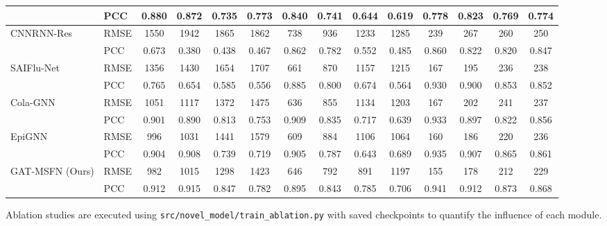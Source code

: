 \begin{table*}[ht]
{\begin{tabular}{llcccccccccccc}
         & PCC  & 0.880 & 0.872 & 0.735 & 0.773 & 0.840 & 0.741 & 0.644 & 0.619 & 0.778 & 0.823 & 0.769 & 0.774 \\
        \midrule
        \multirow{2}{*}{CNNRNN-Res} 
         & RMSE & 1550 & 1942 & 1865 & 1862 & 738 & 936 & 1233 & 1285 & 239 & 267 & 260 & 250 \\
         & PCC  & 0.673 & 0.380 & 0.438 & 0.467 & 0.862 & 0.782 & 0.552 & 0.485 & 0.860 & 0.822 & 0.820 & 0.847 \\
        \midrule
        \multirow{2}{*}{SAIFlu-Net} 
         & RMSE & 1356 & 1430 & 1654 & 1707 & 661 & 870 & 1157 & 1215 & 167 & 195 & 236 & 238 \\
         & PCC  & 0.765 & 0.654 & 0.585 & 0.556 & 0.885 & 0.800 & 0.674 & 0.564 & 0.930 & 0.900 & 0.853 & 0.852 \\
        \midrule
        \multirow{2}{*}{Cola-GNN} 
         & RMSE & 1051 & 1117 & 1372 & 1475 & 636 & 855 & 1134 & 1203 & 167 & 202 & 241 & 237 \\
         & PCC  & 0.901 & 0.890 & 0.813 & 0.753 & 0.909 & 0.835 & 0.717 & 0.639 & 0.933 & 0.897 & 0.822 & 0.856 \\
        \midrule
        \multirow{2}{*}{EpiGNN} 
         & RMSE & 996 & 1031 & 1441 & 1579 & 609 & 884 & 1106 & 1064 & 160 & 186 & 220 & 236 \\
         & PCC  & 0.904 & 0.908 & 0.739 & 0.719 & 0.905 & 0.787 & 0.643 & 0.689 & 0.935 & 0.907 & 0.865 & 0.861 \\
        \midrule
        \multirow{2}{*}{GAT-MSFN (Ours)} 
         & RMSE & 982 & 1015 & 1298 & 1423 & 646 & 792 & 891 & 1197 & 155 & 178 & 212 & 229 \\
         & PCC  & 0.912 & 0.915 & 0.847 & 0.782 & 0.895 & 0.843 & 0.785 & 0.706 & 0.941 & 0.912 & 0.873 & 0.868 \\
        \bottomrule
    \end{tabular}%
    }
\end{table*}

Ablation studies are executed using \texttt{src/novel\_model/train\_ablation.py} with saved checkpoints to quantify the influence of each module.


